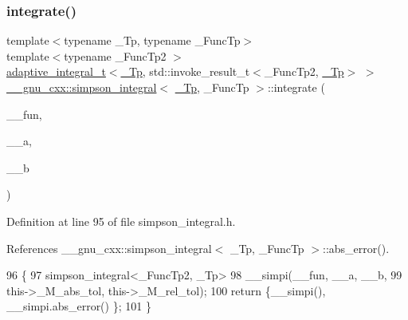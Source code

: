 \subsubsection{\texorpdfstring{integrate()}{integrate()}}
{\footnotesize\ttfamily template$<$typename \+\_\+\+Tp, typename \+\_\+\+Func\+Tp$>$ \\
template$<$typename \+\_\+\+Func\+Tp2 $>$ \\
\hyperlink{struct____gnu__cxx_1_1adaptive__integral__t}{adaptive\+\_\+integral\+\_\+t}$<$\hyperlink{namespace____gnu__cxx_a3b19a9c800ca194374ef9172290f7d79}{\+\_\+\+Tp}, std\+::invoke\+\_\+result\+\_\+t$<$\+\_\+\+Func\+Tp2, \hyperlink{namespace____gnu__cxx_a3b19a9c800ca194374ef9172290f7d79}{\+\_\+\+Tp}$>$ $>$ \hyperlink{class____gnu__cxx_1_1simpson__integral}{\+\_\+\+\_\+gnu\+\_\+cxx\+::simpson\+\_\+integral}$<$ \hyperlink{namespace____gnu__cxx_a3b19a9c800ca194374ef9172290f7d79}{\+\_\+\+Tp}, \+\_\+\+Func\+Tp $>$\+::integrate (\begin{DoxyParamCaption}\item[{\+\_\+\+Func\+Tp2}]{\+\_\+\+\_\+fun,  }\item[{\hyperlink{namespace____gnu__cxx_a3b19a9c800ca194374ef9172290f7d79}{\+\_\+\+Tp}}]{\+\_\+\+\_\+a,  }\item[{\hyperlink{namespace____gnu__cxx_a3b19a9c800ca194374ef9172290f7d79}{\+\_\+\+Tp}}]{\+\_\+\+\_\+b }\end{DoxyParamCaption})\hspace{0.3cm}{\ttfamily [inline]}}



Definition at line 95 of file simpson\+\_\+integral.\+h.



References \+\_\+\+\_\+gnu\+\_\+cxx\+::simpson\+\_\+integral$<$ \+\_\+\+Tp, \+\_\+\+Func\+Tp $>$\+::abs\+\_\+error().


\begin{DoxyCode}
96         \{
97           simpson\_integral<\_FuncTp2, \_Tp>
98             \_\_simpi(\_\_fun, \_\_a, \_\_b,
99                     this->\_M\_abs\_tol, this->\_M\_rel\_tol);
100           \textcolor{keywordflow}{return} \{\_\_simpi(), \_\_simpi.abs\_error() \};
101         \}
\end{DoxyCode}
\mbox{\label{class____gnu__cxx_1_1simpson__integral_a98cd0a2bd09ed77c2c0313ffd4b43689}} 
